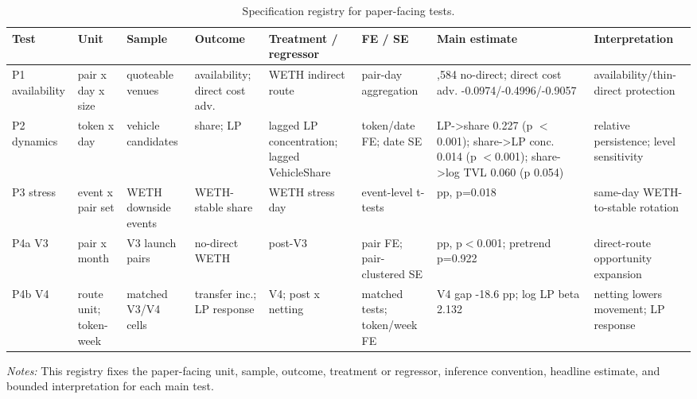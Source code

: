 \documentclass[12pt]{article}
\begin{document}
\begin{landscape}
\begin{table}[!htbp]
\centering
\scriptsize
\setlength{\tabcolsep}{2.5pt}
\begin{threeparttable}
\caption{Specification registry for paper-facing tests.}
\label{tab:specification-registry}
\begin{tabular}{@{}>{\raggedright\arraybackslash}p{}>{\raggedright\arraybackslash}p{}>{\raggedright\arraybackslash}p{}>{\raggedright\arraybackslash}p{}>{\raggedright\arraybackslash}p{}>{\raggedright\arraybackslash}p{}>{\raggedright\arraybackslash}p{}>{\raggedright\arraybackslash}p{}@{}}
\toprule
Test & Unit & Sample & Outcome & Treatment / regressor & FE / SE & Main estimate & Interpretation \\
\midrule
P1 availability & pair x day x size & quoteable venues & availability; direct cost adv. & WETH indirect route & pair-day aggregation & 9,584 no-direct; direct cost adv. -0.0974/-0.4996/-0.9057 & availability/thin-direct protection \\
P2 dynamics & token x day & vehicle candidates & share; LP & lagged LP concentration; lagged VehicleShare & token/date FE; date SE & LP->share 0.227 (p $<$0.001); share->LP conc. 0.014 (p $<$0.001); share->log TVL 0.060 (p 0.054) & relative persistence; level sensitivity \\
P3 stress & event x pair set & WETH downside events & WETH-stable share & WETH stress day & event-level t-tests & -2.96 pp, p=0.018 & same-day WETH-to-stable rotation \\
P4a V3 & pair x month & V3 launch pairs & no-direct WETH & post-V3 & pair FE; pair-clustered SE & -25.81 pp, p$<$0.001; pretrend p=0.922 & direct-route opportunity expansion \\
P4b V4 & route unit; token-week & matched V3/V4 cells & transfer inc.; LP response & V4; post x netting & matched tests; token/week FE & V4 gap -18.6 pp; log LP beta 2.132 & netting lowers movement; LP response \\
\bottomrule
\end{tabular}
\begin{tablenotes}[flushleft]
\footnotesize
\item \textit{Notes:} This registry fixes the paper-facing unit, sample, outcome, treatment or regressor, inference convention, headline estimate, and bounded interpretation for each main test.
\end{tablenotes}
\end{threeparttable}
\end{table}
\end{landscape}
\end{document}
